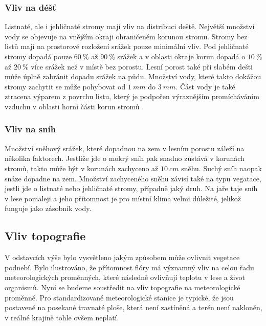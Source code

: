 \subsubsection{Vliv na déšť}
Listnaté, ale i jehličnaté stromy mají vliv na distribuci deště. Největší množství vody se objevuje na vnějším okraji ohraničeném korunou stromu. Stromy bez listů mají na prostorové rozložení srážek pouze minimální vliv. Pod jehličnaté stromy dopadá pouze $\SI{60}{\%}$ až $\SI{90}{\%}$ srážek a v oblasti okraje korun dopadá o $\SI{10}{\%}$ až $\SI{20}{\%}$ více srážek než v místě bez porostu. Lesní porost také při slabém dešti může úplně zabránit dopadu srážek na půdu. Množství vody, které takto dokážou stromy zachytit se může pohybovat od $\SI{1}{mm}$ do $\SI{3}{mm}$. Část vody je také ztracena výparem z povrchu listu, který je podpořen výraznějším promícháváním vzduchu v oblasti horní části korun stromů \cite{alma}.

\subsubsection{Vliv na sníh}
Množství sněhový srážek, které dopadnou na zem v lesním porostu záleží na několika faktorech. Jestliže jde o mokrý sníh pak snadno zůstává v korunách stromů, takto může být v korunách zachyceno až $\SI{10}{cm}$ sněhu. Suchý sníh naopak snáze dopadne na zem. Množství zachyceného sněhu závisí také na typu vegatace, jestli jde o listnaté nebo jehličnaté stromy, případně jaký druh. Na jaře taje sníh v lese pomaleji a jeho přítomnost je pro místní klima velmi důležité, jelikož funguje jako zásobník vody\cite{alma}.

\subsection{Vliv topografie} \label{chap:topo}
V odstavcích výše bylo vysvětleno jakým způsobem může ovlivnit vegetace podnebí. Bylo ilustrováno, že přítomnost flóry má významný vliv na celou řadu meteorologických proměnných, které následně ovlivňují teplotu v lese a život organismů. Nyní se budeme soustředit na vliv topografie na meteorologické proměnné. Pro standardizované meteorologické stanice je typické, že jsou postavené na posekané travnaté ploše, která není zastíněná a terén není nakloněn, v reálné krajině tohle ovšem neplatí.

